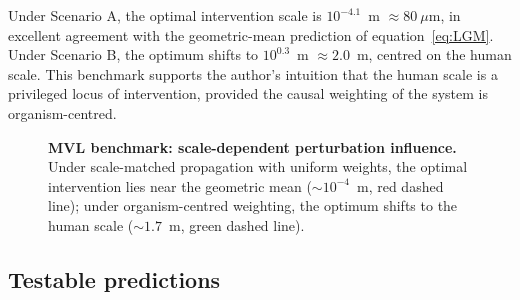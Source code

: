 \documentclass[11pt,a4paper]{article}
\begin{document}
Under Scenario A, the optimal intervention scale is $10^{-4.1}$~m $\approx 80~\mu$m, in excellent agreement with the geometric-mean prediction of equation~\eqref{eq:LGM}. Under Scenario B, the optimum shifts to $10^{0.3}$~m $\approx 2.0$~m, centred on the human scale. This benchmark supports the author's intuition that the human scale is a privileged locus of intervention, provided the causal weighting of the system is organism-centred.

\begin{figure}[htbp]
\centering
{}
\caption{\textbf{MVL benchmark: scale-dependent perturbation influence.} Under scale-matched propagation with uniform weights, the optimal intervention lies near the geometric mean ($\sim 10^{-4}$~m, red dashed line); under organism-centred weighting, the optimum shifts to the human scale ($\sim 1.7$~m, green dashed line).}
\label{fig:simulation}
\end{figure}

\subsection{Testable predictions}
\end{document}
